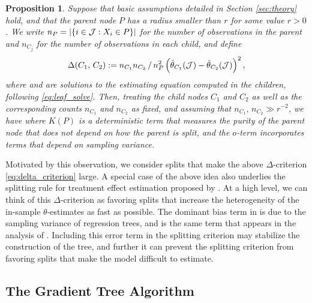\documentclass[aos]{imsart}
\theoremstyle{plain}
\newtheorem{prop}{Proposition}
\theoremstyle{definition}
\theoremstyle{remark}
\begin{document}
\begin{CJK}{UTF8}{gbsn}
{\begin{prop}
\label{prop:motivation}
Suppose that basic assumptions detailed in Section \ref{sec:theory} hold,
and that the parent node $P$ has a radius smaller than
$r$ for some value $r > 0$. We write $n_P = \left\lvert\left\{i\in\mathcal{J} : X_i \in P\right\}\right\rvert$ for the number of
observations in the parent and $n_{C_j}$ for the number of observations in each child, and define
\begin{equation}
\label{eq:delta_criterion}
\Delta(C_1, \, C_2) := {n_{C_1} n_{C_2}}\,/\,{n_P^2}  \p{\htheta_{C_1}(\mathcal{J}) - \htheta_{C_2}(\mathcal{J})}^2,
\end{equation}
where  and  are solutions to the
estimating equation computed in the children, following \eqref{eq:leaf_solve}.
Then, treating the child nodes $C_1$ and $C_2$ as well as the corresponding counts $n_{C_1}$ and $n_{C_2}$
as fixed, and assuming that $n_{C_1}, \, n_{C_2} \gg r^{-2}$, we have
where $K(P)$ is a deterministic term that measures the purity of the parent node
that does not depend on how the parent is split, and the $o$-term incorporates terms that depend on
sampling variance.
\end{prop}

Motivated by this observation, we consider splits that make the above $\Delta$-criterion
\eqref{eq:delta_criterion} large. A special case of the above idea also underlies
the splitting rule for treatment effect estimation proposed by \citet{athey2016recursive}.
At a high level, we can think of this $\Delta$-criterion as favoring splits that
increase the heterogeneity of the in-sample $\theta$-estimates as fast as possible.
The dominant bias term in  is due to the
sampling variance of regression trees, and is the same term that appears in the analysis
of \citet{athey2016recursive}. Including this error term in the splitting criterion may
stabilize the construction of the tree, and further it can prevent the splitting criterion
from favoring splits that make the model difficult to estimate.

\subsection{The Gradient Tree Algorithm}

}
\end{CJK}
\end{document}
